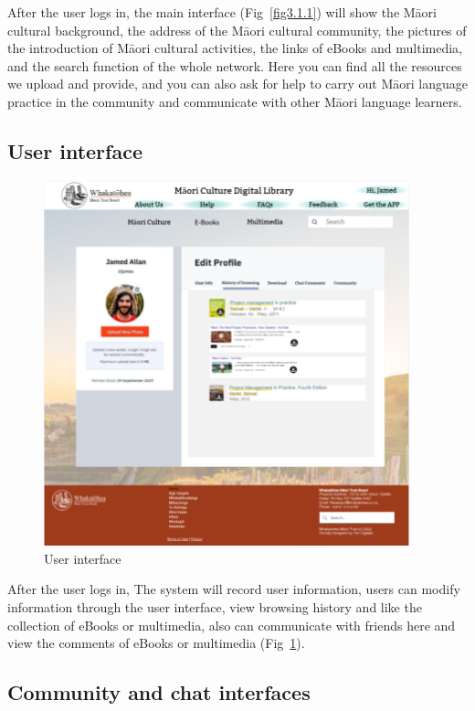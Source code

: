After the user logs in, the main interface (Fig~\ref{fig3.1.1}) will show the Māori cultural background, the address of the Māori cultural community, the pictures of the introduction of Māori cultural activities, the links of eBooks and multimedia, and the search function of the whole network. Here you can find all the resources we upload and provide, and you can also ask for help to carry out Māori language practice in the community and communicate with other Māori language learners.

\subsection{User interface}

\begin{figure}[htbp]
  \centerline{\includegraphics[width=300pt]{images/3-1-2.png}}
  \caption{User interface}
  \label{fig3.1.2}
\end{figure}

After the user logs in, The system will record user information, users can modify information through the user interface, view browsing history and like the collection of eBooks or multimedia, also can communicate with friends here and view the comments of eBooks or multimedia (Fig~\ref{fig3.1.2}).

\subsection{Community and chat interfaces}

